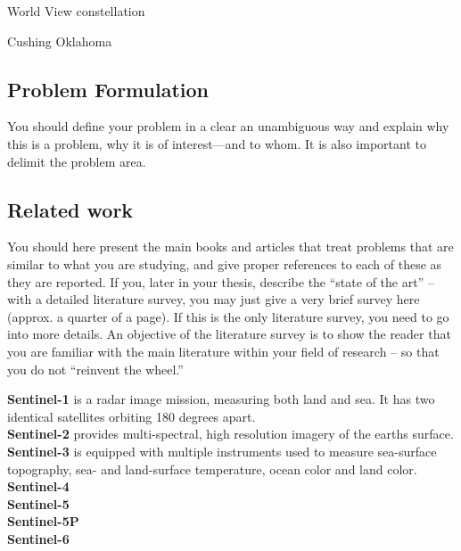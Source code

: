 World View constellation

Cushing Oklahoma

\subsection*{Problem Formulation}
You should define your problem in a clear an unambiguous way and explain why this is a problem, why it is of interest---and to whom. It is also important to delimit the problem area.
\subsection*{Related work}
You should here present the main books and articles that treat problems that are similar to what  you are studying, and give proper references to each of these as they are reported. If you,  later in your thesis, describe the ``state of the art'' -- with a detailed literature survey, you may just give a very brief survey here (approx. a quarter of a page). If this is the only literature survey, you need to go into more details. An objective of the literature survey is to show the reader that you are familiar with the main literature within your field of research -- so that you do not ``reinvent the wheel.''

\textbf{Sentinel-1} is a radar image mission, measuring both land and sea. It has two identical satellites orbiting 180 degrees apart.  \\
\textbf{Sentinel-2} provides multi-spectral, high resolution imagery of the earths surface. \\
\textbf{Sentinel-3} is equipped with multiple instruments used to measure sea-surface topography, sea- and land-surface temperature, ocean color and land color. \\
\textbf{Sentinel-4} \\
\textbf{Sentinel-5} \\
\textbf{Sentinel-5P} \\
\textbf{Sentinel-6} \\



